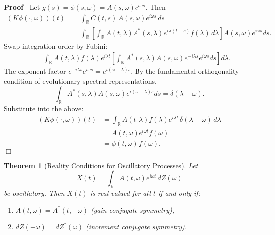 \documentclass{article}
\newenvironment{proof}{\noindent\textbf{Proof\ }}{\hspace*{\fill}$\Box$\medskip}
\newtheorem{theorem}{Theorem}
\begin{document}
\begin{proof}
Let $g(s) = \phi(s,\omega) = A(s,\omega) e^{i\omega s}$. Then
\begin{align*}
(K\phi(\cdot,\omega))(t) &= \int_{\mathbb{R}} C(t,s) \, A(s,\omega) e^{i\omega s}\, ds \\
&= \int_{\mathbb{R}} \left[ \int_{\mathbb{R}} A(t,\lambda) A^*(s,\lambda) e^{i\lambda(t-s)} f(\lambda)\, d\lambda \right]
   A(s,\omega) e^{i\omega s} ds.
\end{align*}
Swap integration order by Fubini:
\begin{align*}
&= \int_{\mathbb{R}} A(t,\lambda) f(\lambda) e^{i\lambda t}
    \left[ \int_{\mathbb{R}} A^*(s,\lambda) A(s,\omega) e^{-i\lambda s} e^{i\omega s} ds \right] d\lambda.
\end{align*}
The exponent factor $e^{-i\lambda s} e^{i\omega s} = e^{i(\omega-\lambda)s}$.  
By the fundamental orthogonality condition of evolutionary spectral representations,
\[
\int_{\mathbb{R}} A^*(s,\lambda) A(s,\omega) e^{i(\omega-\lambda)s} ds = \delta(\lambda-\omega).
\]
Substitute into the above:
\begin{align*}
(K\phi(\cdot,\omega))(t) &= \int_{\mathbb{R}} A(t,\lambda) f(\lambda) e^{i\lambda t} \, \delta(\lambda-\omega)\, d\lambda \\
&= A(t,\omega) e^{i\omega t} f(\omega) \\
&= \phi(t,\omega) \, f(\omega).
\end{align*}
\end{proof}

\begin{theorem}
  [Reality Conditions for Oscillatory Processes]
  Let
  \[
  X (t) = \int_{\mathbb{R}} A (t, \omega) e^{i \omega t} \, dZ (\omega)
  \]
  be oscillatory. Then $X(t)$ is real-valued for all $t$
  if and only if:
  \begin{enumerate}
    \item $A (t, \omega) = A^{\ast} (t, - \omega)$ (gain conjugate symmetry),
    \item $dZ (- \omega) = dZ^{\ast} (\omega)$ (increment conjugate symmetry).
  \end{enumerate}
\end{theorem}
\end{document}
